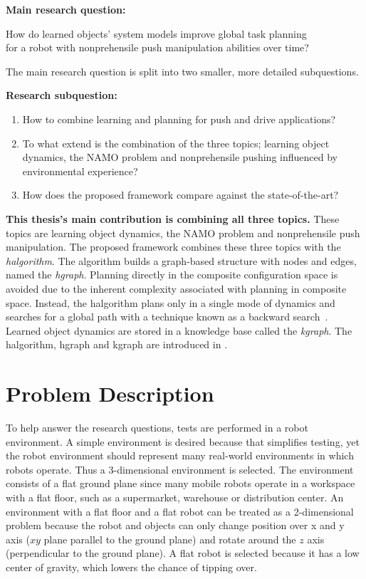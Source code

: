 \textbf{Main research question:}
\begin{center}%
\label{researchquestion:main}
\large
How do learned objects' system models improve global task planning\\for a robot with nonprehensile push manipulation abilities over time?
\end{center}

The main research question is split into two smaller, more detailed subquestions.\bs

\textbf{Research subquestion:}
\begin{enumerate}
    \item\label{researchsubquestion:does_it_work} How to combine learning and planning for push and drive applications?
    \item\label{researchsubquestion:does_it_remember} To what extend is the combination of the three topics; learning object dynamics, the \ac{NAMO} problem and nonprehensile pushing influenced by environmental experience?
    \item\label{researchsubquestion:does_it_compare} How does the proposed framework compare against the state-of-the-art?
\end{enumerate}

\textbf{This thesis's main contribution is combining all three topics.} These topics are learning object dynamics, the \ac{NAMO} problem and nonprehensile push manipulation. The proposed framework combines these three topics with the \textit{\acl{halgorithm}}. The algorithm builds a graph-based structure with nodes and edges, named the \textit{\acl{hgraph}}. Planning directly in the composite configuration space is avoided due to the inherent complexity associated with planning in composite space. Instead, the \acl{halgorithm} plans only in a single mode of dynamics and searches for a global path with a technique known as a backward search~\cite{krontiris_dealing_2015}. Learned object dynamics are stored in a knowledge base called the \textit{\acl{kgraph}}. The \acl{halgorithm}, \acl{hgraph} and \acl{kgraph} are introduced in .\bs

\section{Problem Description}%
\label{sec:problem_description}
To help answer the research questions, tests are performed in a robot environment. A simple environment is desired because that simplifies testing, yet the robot environment should represent many real-world environments in which robots operate. Thus a 3-dimensional environment is selected. The environment consists of a flat ground plane since many mobile robots operate in a workspace with a flat floor, such as a supermarket, warehouse or distribution center. An environment with a flat floor and a flat robot can be treated as a 2-dimensional problem because the robot and objects can only change position over \gls{x} and \gls{y} axis ($xy$ plane parallel to the ground plane) and rotate around the $z$ axis (perpendicular to the ground plane). A flat robot is selected because it has a low center of gravity, which lowers the chance of tipping over.\bs

